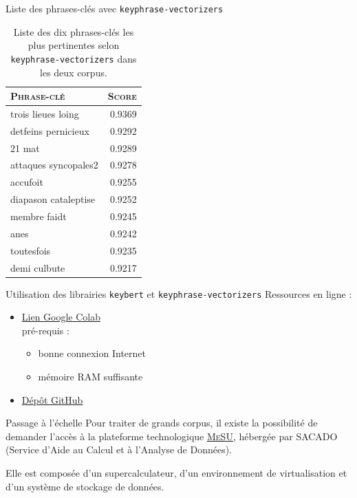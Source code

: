 \begin{frame}{Liste des phrases-clés avec \texttt{keyphrase-vectorizers}}
\begin{table}[!htb]
\begin{minipage}{.5\linewidth}
\begin{tabular}{l|r}
         \rowcolor[HTML]{FFCCC9} 
\textsc{\textbf{Phrase-clé}} & \cellcolor[HTML]{DAE8FC}\textsc{\textbf{Score}} \\ \hline
            trois lieues loing & 0.9369 \\
			detfeins pernicieux & 0.9292 \\
			21 mat & 0.9289 \\
			attaques syncopales2 & 0.9278 \\
			accufoit & 0.9255 \\
			diapason cataleptise & 0.9252 \\
			membre faidt & 0.9245 \\
			anes & 0.9242 \\
			toutesfois & 0.9235 \\
			demi culbute & 0.9217
        \end{tabular}
    \end{minipage} 
      \caption{Liste des dix phrases-clés les plus pertinentes selon \texttt{keyphrase-vectorizers} dans les deux corpus.}
\end{table}
\end{frame}

\begin{frame}{Utilisation des librairies \texttt{keybert} et \texttt{keyphrase-vectorizers}}
Ressources en ligne : \pause
\begin{itemize}[<+->]
\item \href{https://colab.research.google.com/drive/1sBJP-lJcKZPgIqWzFRNfrBn3domuy1tP?usp=sharing}{Lien Google Colab}\\
pré-requis :
\begin{itemize}[<+->]
\item bonne connexion Internet
\item mémoire RAM suffisante
\end{itemize}
\item \href{https://github.com/ljpetkovic/Charcot\_KeyBERT\_Keyphrase-Vectorizers?tab=readme-ov-file}{Dépôt GitHub}
\end{itemize}

\end{frame}

\begin{frame}{Passage à l'échelle}
\pause
Pour traiter de grands corpus, il existe la possibilité de demander l'accès à la plateforme technologique \href{https://sacado.sorbonne-universite.fr/}{\textsc{MeSU}}, hébergée par \textsc{SACADO} (Service d’Aide au Calcul et à l’Analyse de Données).\pause
\bigskip

Elle est composée d’un supercalculateur, d’un environnement de virtualisation et d’un système de stockage de données.
\end{frame}

